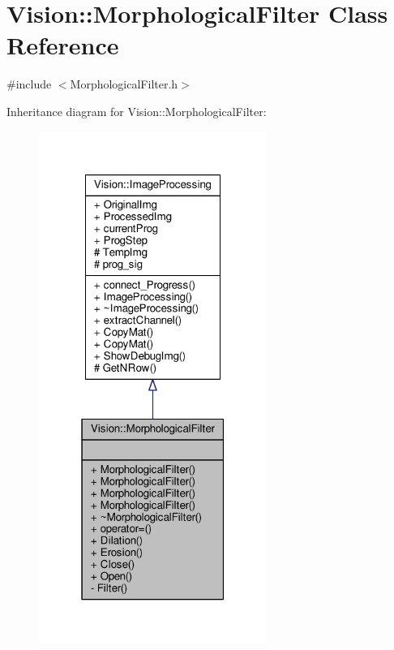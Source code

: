 \hypertarget{class_vision_1_1_morphological_filter}{}\section{Vision\+:\+:Morphological\+Filter Class Reference}
\label{class_vision_1_1_morphological_filter}


{\ttfamily \#include $<$Morphological\+Filter.\+h$>$}



Inheritance diagram for Vision\+:\+:Morphological\+Filter\+:\nopagebreak
\begin{figure}[H]
\begin{center}
\leavevmode
\includegraphics[width=211pt]{class_vision_1_1_morphological_filter__inherit__graph}
\end{center}
\end{figure}


